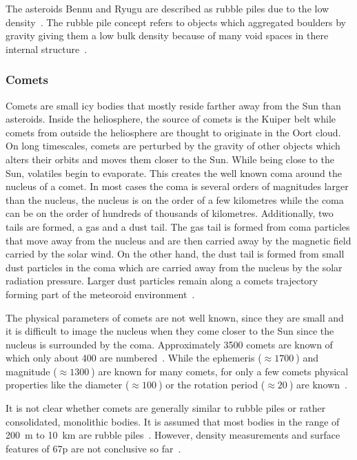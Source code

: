 The asteroids Bennu and Ryugu are described as rubble piles due to the low density~\cite{Chesley2014OrbitBennu, Watanabe2019Hayabusa2Pile}. The rubble pile concept refers to objects which aggregated boulders by gravity giving them a low bulk density because of many void spaces in there internal structure~\cite{Richardson2002GravitationalEvolution}.

\subsubsection{Comets}
Comets are small icy bodies that mostly reside farther away from the Sun than asteroids. Inside the heliosphere, the source of comets is the Kuiper belt while comets from outside the heliosphere are thought to originate in the Oort cloud. On long timescales, comets are perturbed by the gravity of other objects which alters their orbits and moves them closer to the Sun. While being close to the Sun, volatiles begin to evaporate. This creates the well known coma around the nucleus of a comet. In most cases the coma is several orders of magnitudes larger than the nucleus, the nucleus is on the order of a few kilometres while the coma can be on the order of hundreds of thousands of kilometres. Additionally, two tails are formed, a gas and a dust tail. The gas tail is formed from coma particles that move away from the nucleus and are then carried away by the magnetic field carried by the solar wind. On the other hand, the dust tail is formed from small dust particles in the coma which are carried away from the nucleus by the solar radiation pressure. Larger dust particles remain along a comets trajectory forming part of the meteoroid environment~\cite{Soja2019IMEM2:System, a2017comets, Comets}.

The physical parameters of comets are not well known, since they are small and it is difficult to image the nucleus when they come closer to the Sun since the nucleus is surrounded by the coma. Approximately \SI{3500}{} comets are known of which only about \SI{400}{} are numbered~\cite{JPLEngine}. While the ephemeris ($\approx \SI{1700}{}$) and magnitude ($\approx \SI{1300}{}$) are known for many comets, for only a few comets physical properties like the diameter ($\approx \SI{100}{}$) or the rotation period ($\approx \SI{20}{}$) are known~\cite{JPLEngine}.

It is not clear whether comets are generally similar to rubble piles or rather consolidated, monolithic bodies. It is assumed that most bodies in the range of \SI{200}{\meter} to \SI{10}{\kilo\meter} are rubble piles~\cite{Walsh2018RubbleAsteroids}. However, density measurements and surface features of \gls{67p} are not conclusive so far~\cite{Weissman2020OriginNuclei}. 

